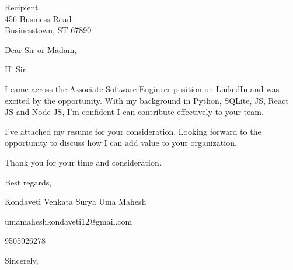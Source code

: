 \documentclass{letter}
\begin{document}
\begin{letter}{Recipient\\456 Business Road\\Businesstown, ST 67890}

\opening{Dear Sir or Madam,}

Hi Sir,

I came across the Associate Software Engineer position on LinkedIn and was excited by the opportunity. With my background in Python, SQLite, JS, React JS and Node JS, I’m confident I can contribute effectively to your team.

I've attached my resume for your consideration. Looking forward to the opportunity to discuss how I can add value to your organization.

Thank you for your time and consideration.

Best regards,

Kondaveti Venkata Surya Uma Mahesh

umamaheshkondaveti12@gmail.com

9505926278



\closing{Sincerely,}

\end{letter}
\end{document}
